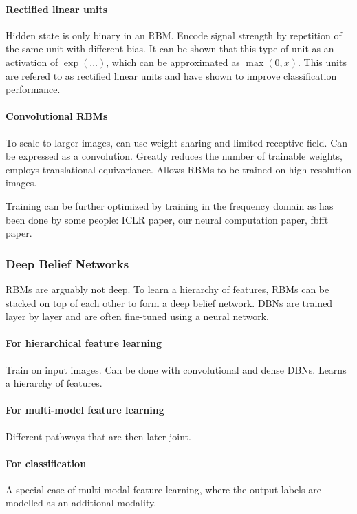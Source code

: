 \documentclass{report}
\begin{document}
\paragraph{Rectified linear units} Hidden state is only binary in an RBM. Encode
signal strength by repetition of the same unit with different bias. It can be
shown that this type of unit as an activation of $\exp(...)$, which can be
approximated as $\max(0, x)$. This units are refered to as rectified linear
units and have shown to improve classification performance.

\paragraph{Convolutional RBMs} To scale to larger images, can use weight sharing
and limited receptive field. Can be expressed as a convolution. Greatly reduces
the number of trainable weights, employs translational equivariance. Allows RBMs
to be trained on high-resolution images.

Training can be further optimized by training in the frequency domain as has
been done by some people: ICLR paper, our neural computation paper, fbfft
paper.

\subsubsection{Deep Belief Networks}

RBMs are arguably not deep. To learn a hierarchy of features, RBMs can be
stacked on top of each other to form a deep belief network. DBNs are trained
layer by layer and are often fine-tuned using a neural network.

\paragraph{For hierarchical feature learning}
Train on input images. Can be done with convolutional and dense DBNs. Learns a
hierarchy of features.

\paragraph{For multi-model feature learning}
Different pathways that are then later joint.

\paragraph{For classification}
A special case of multi-modal feature learning, where the output labels are
modelled as an additional modality.
\end{document}
